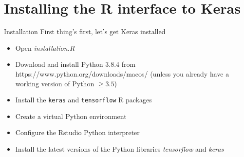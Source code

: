 \documentclass{beamer}
\begin{document}
\section{Installing the R interface to Keras}
\begin{frame}{Installation}
 First thing's first, let's get Keras installed
\begin{itemize}
\item Open \textit{installation.R}
\item Download and install Python 3.8.4 from https://www.python.org/downloads/macos/ (unless you already have a working version of Python $\geq 3.5$)
\item Install the \texttt{keras} and \texttt{tensorflow} R packages
\item Create a virtual Python environment 
\item Configure the Rstudio Python interpreter
\item Install the latest versions of the Python libraries \textit{tensorflow} and \textit{keras}
\end{itemize}
\end{frame}
\end{document}
